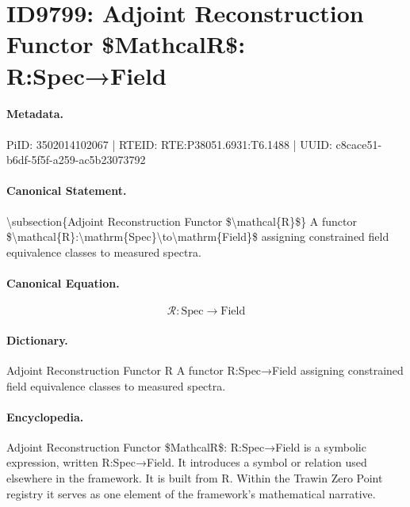 \section*{ID9799: Adjoint Reconstruction Functor \$MathcalR\$: R:Spec→Field}
\paragraph{Metadata.}
PiID: 3502014102067 | RTEID: RTE:P38051.6931:T6.1488 | UUID: c8cace51-b6df-5f5f-a259-ac5b23073792

\paragraph{Canonical Statement.}
\textbackslash{}subsection\{Adjoint Reconstruction Functor \$\textbackslash{}mathcal\{R\}\$\} A functor \$\textbackslash{}mathcal\{R\}:\textbackslash{}mathrm\{Spec\}\textbackslash{}to\textbackslash{}mathrm\{Field\}\$ assigning constrained field equivalence classes to measured spectra.

\paragraph{Canonical Equation.}
\[
\mathcal{R}:\mathrm{Spec}\to\mathrm{Field}
\]

\paragraph{Dictionary.}
Adjoint Reconstruction Functor R A functor R:Spec→Field assigning constrained field equivalence classes to measured spectra.

\paragraph{Encyclopedia.}
Adjoint Reconstruction Functor \$MathcalR\$: R:Spec→Field is a symbolic expression, written R:Spec→Field. It introduces a symbol or relation used elsewhere in the framework. It is built from R. Within the Trawin Zero Point registry it serves as one element of the framework's mathematical narrative.
